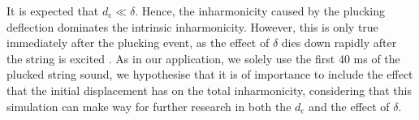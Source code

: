 \documentclass{article}
\begin{document}
\begin{sloppy}
% 
% 
% 
% 
% 
%
It is expected that $d_\text{c}\ll\delta$. %
Hence, the inharmonicity caused by the plucking deflection dominates the intrinsic inharmonicity. However, this is only true immediately after the plucking event, as the effect of $\delta$ dies down rapidly after the string is excited \cite{rossing:science_of_string_instruments}. %
As in our application, we solely use the first 40 ms of the plucked string sound, we hypothesise that it is of importance to include the effect that the initial displacement has on the total inharmonicity, considering that this simulation can make way for further research in both the $d_\text{c}$ and the effect of $\delta$.
%

\end{sloppy}
\end{document}
